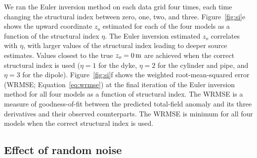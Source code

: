 We ran the Euler inversion method on each data grid four times, each time
changing the structural index between zero, one, two, and three.
Figure~\ref{fig:si}e shows the upward coordinate $z_o$ estimated for each of the four models as a function of the structural index $\eta$.
The Euler inversion estimated $z_o$ correlates with $\eta$, with larger values of the structural index leading to deeper source estimates.
Values closest to the true $z_o=\SynSITrueUp$ are achieved when the correct structural index is used ($\eta=1$ for the dyke, $\eta=2$ for the cylinder and pipe, and $\eta=3$ for the dipole).
Figure~\ref{fig:si}f shows the weighted root-mean-squared error (WRMSE; Equation~\ref{eq:wrmse}) at the final iteration of the Euler inversion method for all four models as a function of structural index.
The WRMSE is a measure of goodness-of-fit between the predicted total-field anomaly and its three derivatives and their observed counterparts.
The WRMSE is minimum for all four models when the correct structural index is used.


\subsection{Effect of random noise}
\label{sec:noise}

